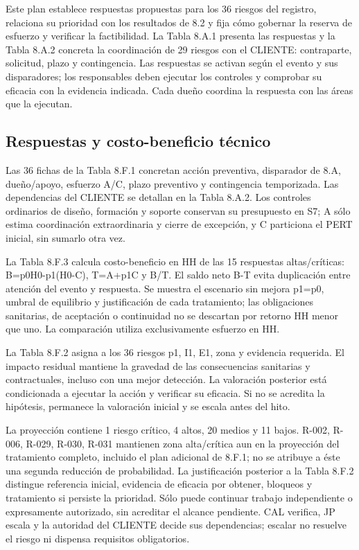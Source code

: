 Este plan establece respuestas propuestas para los 36 riesgos del registro, relaciona su prioridad con los resultados de 8.2 y fija cómo gobernar la reserva de esfuerzo y verificar la factibilidad. La Tabla 8.A.1 presenta las respuestas y la Tabla 8.A.2 concreta la coordinación de 29 riesgos con el CLIENTE: contraparte, solicitud, plazo y contingencia. Las respuestas se activan según el evento y sus disparadores; los responsables deben ejecutar los controles y comprobar su eficacia con la evidencia indicada. Cada dueño coordina la respuesta con las áreas que la ejecutan.

\subsection{Respuestas y costo-beneficio técnico}
Las 36 fichas de la Tabla 8.F.1 concretan acción preventiva, disparador de 8.A, dueño/apoyo, esfuerzo A/C, plazo preventivo y contingencia temporizada. Las dependencias del CLIENTE se detallan en la Tabla 8.A.2. Los controles ordinarios de diseño, formación y soporte conservan su presupuesto en S7; A sólo estima coordinación extraordinaria y cierre de excepción, y C particiona el PERT inicial, sin sumarlo otra vez.

La Tabla 8.F.3 calcula costo-beneficio en HH de las 15 respuestas altas/críticas: B=p0H0-p1(H0-C), T=A+p1C y B/T. El saldo neto B-T evita duplicación entre atención del evento y respuesta. Se muestra el escenario sin mejora p1=p0, umbral de equilibrio y justificación de cada tratamiento; las obligaciones sanitarias, de aceptación o continuidad no se descartan por retorno HH menor que uno. La comparación utiliza exclusivamente esfuerzo en HH.

La Tabla 8.F.2 asigna a los 36 riesgos p1, I1, E1, zona y evidencia requerida. El impacto residual mantiene la gravedad de las consecuencias sanitarias y contractuales, incluso con una mejor detección. La valoración posterior está condicionada a ejecutar la acción y verificar su eficacia. Si no se acredita la hipótesis, permanece la valoración inicial y se escala antes del hito.

La proyección contiene 1 riesgo crítico, 4 altos, 20 medios y 11 bajos. R-002, R-006, R-029, R-030, R-031 mantienen zona alta/crítica aun en la proyección del tratamiento completo, incluido el plan adicional de 8.F.1; no se atribuye a éste una segunda reducción de probabilidad. La justificación posterior a la Tabla 8.F.2 distingue referencia inicial, evidencia de eficacia por obtener, bloqueos y tratamiento si persiste la prioridad. Sólo puede continuar trabajo independiente o expresamente autorizado, sin acreditar el alcance pendiente. CAL verifica, JP escala y la autoridad del CLIENTE decide sus dependencias; escalar no resuelve el riesgo ni dispensa requisitos obligatorios.

